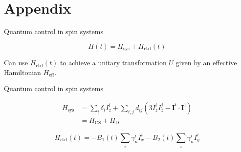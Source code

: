 \documentclass{beamer}
\begin{document}
\section{Appendix}


\begin{frame}{Quantum control in spin systems}

\[
    H(t) = H_{\text{sys}} + H_{\text{ctrl}}(t)
\]

Can use $H_{\text{ctrl}}(t)$ to achieve
a unitary transformation $U$ given by an effective Hamiltonian $H_\text{eff}$.


\begin{figure}
\centering

\end{figure}

\end{frame}


\begin{frame}{Quantum control in spin systems}


\begin{align*}
    H_{\text{sys}} &= \sum_i \delta_i I_z^i + \sum_{i,j} d_{ij} \left( 3I_z^iI_z^j - \mathbf{I^i} \cdot \mathbf{I^j} \right) \\
        &= H_\text{CS} + H_\text{D}
\end{align*}

\[
    H_{\text{ctrl}}(t) = -B_1(t) \sum_i \gamma_n^i I_x^i -B_2(t) \sum_i \gamma_n^i I_y^i
\]

\end{frame}
\end{document}
